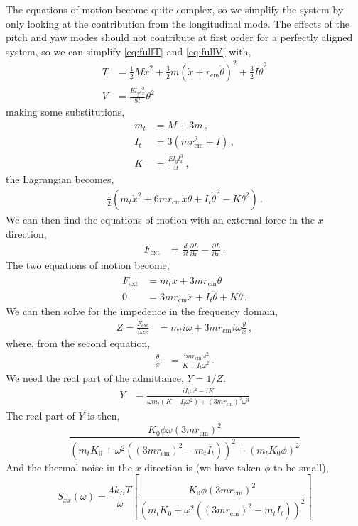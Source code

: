 The equations of motion become quite complex, so we simplify the system by only
looking at the contribution from the longitudinal mode. The effects of the pitch
and yaw modes should not contribute at first order for a perfectly aligned
system, so we can simplify \eqref{eq:fullT} and \eqref{eq:fullV} with,
\begin{align}
T &= \frac{1}{2} M\dot{x}^2
    + \frac{3}{2} m\left(\dot{x}+r_{\mathrm{cm}}\dot{\theta} \right)^2
    + \frac{3}{2} I\dot{\theta}^2 \\
V &= \frac{E l_y l_x^3}{8t}\theta^2 
\end{align}
making some substitutions,
\begin{align}
m_t &= M+3m \, , \\
I_t &= 3 \left( mr_{\mathrm{cm}}^2+I \right) \, , \\
K &= \frac{E l_y l_x^3}{4t} \, ,
\end{align}
the Lagrangian becomes,
\begin{align}
\frac{1}{2} \left( m_t \dot{x}^2 +6mr_{\mathrm{cm}}\dot{x}\dot{\theta}
+ I_t\dot{\theta}^2 -K\theta^2 \right) \, .
\end{align}
We can then find the equations of motion with an external force in
the $x$ direction,
\begin{align}
F_{\mathrm{ext}} &= \frac{d}{dt}\frac{\partial L}{\partial \dot{x}}
  - \frac{\partial L}{\partial x} \,.
\end{align}
The two equations of motion become,
\begin{align}
F_{\mathrm{ext}} &= m_t \ddot{x} + 3mr_{\mathrm{cm}}\ddot{\theta} \\
0 &= 3mr_{\mathrm{cm}}\ddot{x} + I_t\ddot{\theta} + K\theta \, .
\end{align}
We can then solve for the impedence in the frequency domain,
\begin{align}
Z = \frac{F_{\mathrm{ext}}}{i\omega x} &= m_t i\omega
  + 3mr_{\mathrm{cm}}i\omega \frac{\theta}{x} \,,
\end{align}
where, from the second equation,
\begin{align}
\frac{\theta}{x} &= \frac{3mr_{\mathrm{cm}}\omega^2}{K-I_t\omega^2} \,.
\end{align}
We need the real part of the admittance, $Y=1/Z$.
\begin{align}
Y &= \frac{iI_t\omega^2-iK}{\omega m_t(K-I_t\omega^2) + (3mr_{\mathrm{cm}})^2\omega^3}
\end{align}
The real part of $Y$ is then,
\begin{equation}
\frac{K_0 \phi \omega (3mr_{\mathrm{cm}})^2}{ \left(
  m_tK_0 + \omega^2 \left( (3mr_{\mathrm{cm}})^2 -m_tI_t \right) \right)^2
  + (m_tK_0 \phi)^2 }
\end{equation}
And the thermal noise in the $x$ direction is (we have taken $\phi$ to be small),
\begin{equation}
S_{xx}(\omega) = \frac{4k_BT}{\omega} \left[
  \frac{K_0\phi (3mr_{\mathrm{cm}})^2}{\left( m_tK_0 + \omega^2 \left( (3mr_{\mathrm{cm}})^2 -m_tI_t \right)
  \right)^2 }
  \right] \label{eq:tnoisesusfull}
\end{equation}

